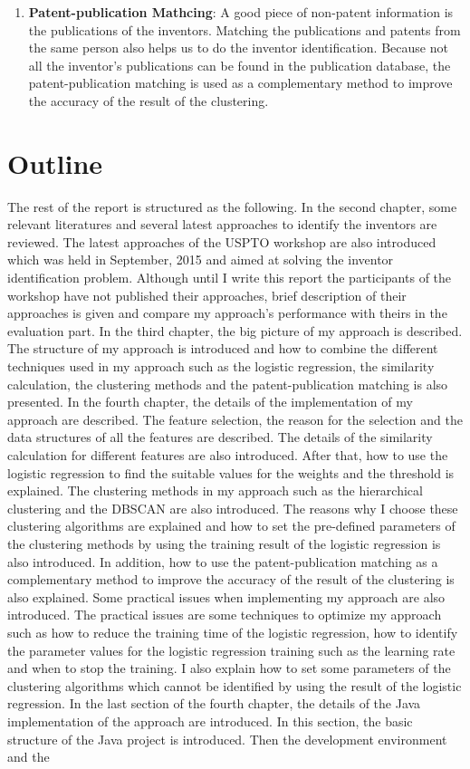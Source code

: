 \begin{enumerate}
\item \textbf{Patent-publication Mathcing}: A good piece of non-patent information is the publications of the inventors. Matching the publications and patents from the same person also helps us to do the inventor identification. Because not all the inventor's publications can be found in the publication database, the patent-publication matching is used as  a complementary method to improve the accuracy of the result of the clustering.

\end{enumerate}
 

\section{Outline}
The rest of the report is structured as the following. In the second chapter,  some relevant literatures and several latest approaches to identify the inventors are reviewed. The latest approaches of the USPTO workshop are also introduced which was held in September, 2015 and aimed at solving the inventor identification problem. Although until I write this report the participants of the workshop have not published their approaches, brief description of their approaches is given and compare my approach's performance with theirs in the evaluation part. In the third chapter,  the big picture of my approach is described.  The structure of my approach  is introduced and how to combine the different techniques used in my approach such as the logistic regression, the similarity calculation, the clustering methods and the patent-publication matching is also presented. In the fourth chapter, the details of the implementation of my approach are described. The  feature selection, the reason for the selection and the data structures of all the features are described. The details of the similarity calculation for different features are also introduced. After that, how to use the logistic regression to find the suitable values for the weights and the threshold is explained.  The clustering methods in my approach such as the hierarchical clustering and the DBSCAN are also introduced.  The reasons why I choose these clustering algorithms are explained and how to set the pre-defined parameters of the clustering methods by using the training result of the logistic regression is also introduced. In addition, how to use the patent-publication matching as a complementary method to improve the accuracy of the result of the clustering is also explained. Some practical issues when  implementing my approach are also introduced. The practical issues are some techniques to optimize my approach such as how to reduce the training time of the logistic regression, how to identify the parameter values for the logistic regression training such as the learning rate and when to stop the training. I also explain how to set some parameters of the clustering algorithms which cannot be identified by using the result of the logistic regression. In the last section of the fourth chapter, the details of the Java implementation of the approach are introduced. In this section, the basic structure of the Java project is introduced. Then the development environment and the 